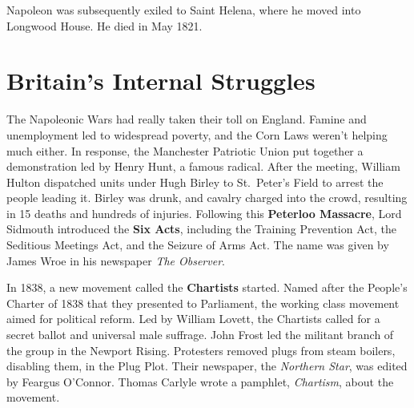 Napoleon was subsequently exiled to Saint Helena, where he moved into Longwood House.
He died in May 1821.

\section{Britain's Internal Struggles}

The Napoleonic Wars had really taken their toll on England.
Famine and unemployment led to widespread poverty, and the Corn Laws weren't helping much either.
In response, the Manchester Patriotic Union put together a demonstration led by Henry Hunt, a famous radical.
After the meeting,
William Hulton dispatched units under Hugh Birley to St.\ Peter's Field to arrest the people leading it.
Birley was drunk, and cavalry charged into the crowd, resulting in 15 deaths and hundreds of injuries.
Following this \textbf{Peterloo Massacre},
Lord Sidmouth introduced the \textbf{Six Acts}, including
the Training Prevention Act,
the Seditious Meetings Act,
and the Seizure of Arms Act.
The name was given by James Wroe in his newspaper \textit{The Observer}.

In 1838, a new movement called the \textbf{Chartists} started.
Named after the People's Charter of 1838 that they presented to Parliament,
the working class movement aimed for political reform.
Led by William Lovett, the Chartists called for a secret ballot and universal male suffrage.
John Frost led the militant branch of the group in the Newport Rising.
Protesters removed plugs from steam boilers, disabling them, in the Plug Plot.
Their newspaper, the \textit{Northern Star}, was edited by Feargus O'Connor.
Thomas Carlyle wrote a pamphlet, \textit{Chartism}, about the movement.
